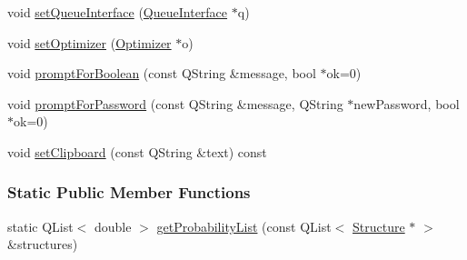 \begin{DoxyCompactItemize}
\item 
void \hyperlink{classGlobalSearch_1_1OptBase_add9178a3bfd695f1d42191a328956451}{set\+Queue\+Interface} (\hyperlink{classGlobalSearch_1_1QueueInterface}{Queue\+Interface} $\ast$q)
\item 
void \hyperlink{classGlobalSearch_1_1OptBase_addd46a192c8a68553a12b30d18246f1e}{set\+Optimizer} (\hyperlink{classGlobalSearch_1_1Optimizer}{Optimizer} $\ast$o)
\item 
void \hyperlink{classGlobalSearch_1_1OptBase_a3460f008a4a3cc3f8d00b3c0cd531069}{prompt\+For\+Boolean} (const Q\+String \&message, bool $\ast$ok=0)
\item 
void \hyperlink{classGlobalSearch_1_1OptBase_a934195fac431de2882383b0483505c95}{prompt\+For\+Password} (const Q\+String \&message, Q\+String $\ast$new\+Password, bool $\ast$ok=0)
\item 
void \hyperlink{classGlobalSearch_1_1OptBase_a3a509ee5a0aa4d8021dcb2d1bc34f1c1}{set\+Clipboard} (const Q\+String \&text) const 
\end{DoxyCompactItemize}
\subsubsection*{Static Public Member Functions}
\begin{DoxyCompactItemize}
\item 
static Q\+List$<$ double $>$ \hyperlink{classGlobalSearch_1_1OptBase_a863b23c21cf06829e39420fcc94f0348}{get\+Probability\+List} (const Q\+List$<$ \hyperlink{classGlobalSearch_1_1Structure}{Structure} $\ast$ $>$ \&structures)
\end{DoxyCompactItemize}
